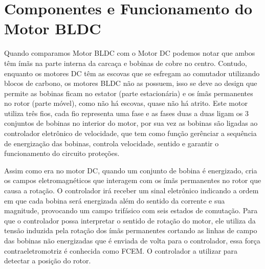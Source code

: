 \documentclass[11pt]{article}
\begin{document}
\section{Componentes e Funcionamento do Motor BLDC}
    \noindent Quando comparamos Motor BLDC com o Motor DC podemos notar que ambos têm ímãs na parte interna da carcaça e bobinas de cobre no centro. Contudo, enquanto 
    os motores DC têm as escovas que se esfregam ao comutador utilizando blocos de carbono, os motores BLDC não as possuem, isso se deve ao design que permite as bobinas ficam no estator (parte estacionária) 
    e os ímãs permanentes no rotor (parte móvel), como não há escovas, quase não há atrito. Este motor utiliza três fios, cada fio representa uma fase e as fases duas a duas 
    ligam os 3 conjuntos de bobinas no interior do motor, por sua vez as bobinas são ligadas ao controlador eletrônico de velocidade, que tem como função 
    gerênciar a sequência de energização das bobinas, controla velocidade, sentido e garantir o funcionamento do circuito proteções.
    
    Assim como era no motor DC, quando um conjunto de bobina é energizado, cria os campos eletromagnéticos que interagem com os ímãs permanentes no rotor que causa a rotação. O controlador 
    irá receber um sinal eletrônico indicando a ordem em que cada bobina será energizada além do sentido da corrente e sua magnitude, provocando um campo trifásico com seis estados de comutação. 
    Para que o controlador possa interpretar o sentido de rotação do motor, ele utiliza da tensão induzida pela rotação dos ímãs permanentes cortando as linhas de campo 
    das bobinas não energizadas que é enviada de volta para o controlador, essa força contraeletromotriz é conhecida como FCEM. O controlador a utilizar para detectar a posição do rotor.
    
    \bigskip
\end{document}
